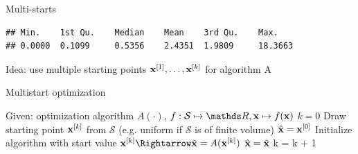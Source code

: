 \documentclass[11pt,compress,t,notes=noshow, xcolor=table]{beamer}
\begin{document}
\begin{vbframe}{Multi-starts}
\footnotesize
\begin{verbatim}
## Min.    1st Qu.    Median    Mean    3rd Qu.    Max.
## 0.0000  0.1099     0.5356    2.4351  1.9809     18.3663
\end{verbatim}








\framebreak
\normalsize








\normalsize
\framebreak

Idea: use multiple starting points $\mathbf{x}^{[1]}, \ldots, \mathbf{x}^{[k]}$ for algorithm A

\begin{algorithm}[H]
  \begin{footnotesize}
  \begin{center}
  \caption{Multistart optimization}
    \begin{algorithmic}[1]
    \State Given: optimization algorithm $A(\cdot)$, $f: \mathcal{S} \mapsto \R, \xv \mapsto f(\xv)$
    \State $k = 0$
      \Repeat
        \State Draw starting point  $\mathbf{x}^{[k]}$ from $\mathcal{S}$ (e.g. uniform if $\mathcal{S}$ is of finite volume)
          $\hat{\mathbf{x}}= \mathbf{x}^{[0]}$
        \EndIf
        \State Initialize algorithm with start value $\xv^{[k]} \Rightarrow \tilde{\xv} = A(\xv^{[k]})$
          $\hat{\mathbf{x}} = \tilde{\mathbf{x}}$
        \EndIf
        \State k = k + 1
      \\
    \Return{$\hat{\xv}$}
    \end{algorithmic}
    \end{center}
    \end{footnotesize}
\end{algorithm}


\end{vbframe}
\end{document}
